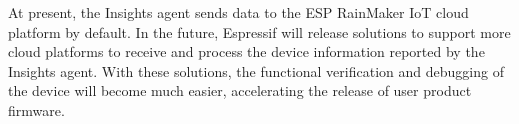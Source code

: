\documentclass[a4paper,12pt,openany]{book}
\begin{document}
At present, the Insights agent sends data to the ESP RainMaker IoT cloud platform by default. In the future, Espressif will release solutions to support more cloud platforms to receive and process the device information reported by the Insights agent. With these solutions, the functional verification and debugging of the device will become much easier, accelerating the release of user product firmware.
\end{document}
